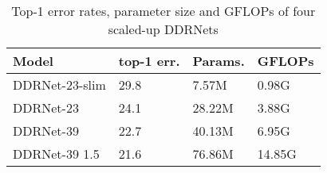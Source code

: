 \documentclass[journal]{IEEEtran}
\begin{document}
\begin{table}[]
\caption{Top-1 error rates, parameter size and GFLOPs of four scaled-up DDRNets}
\label{tab:5}
\begin{tabular}{p{70pt}p{33pt}<{\centering}p{55pt}<{\centering}p{45pt}<{\centering}}
\toprule
Model                    & top-1 err.           & Params.              & GFLOPs        \\ \midrule
DDRNet-23-slim           & 29.8                 & 7.57M                & 0.98G               \\ \midrule
DDRNet-23                & 24.1                 & 28.22M               & 3.88G               \\ \midrule
DDRNet-39                & 22.7                 & 40.13M               & 6.95G               \\ \midrule
DDRNet-39 1.5    & 21.6                 & 76.86M               & 14.85G              \\ \bottomrule
\end{tabular}
\end{table}
\end{document}
